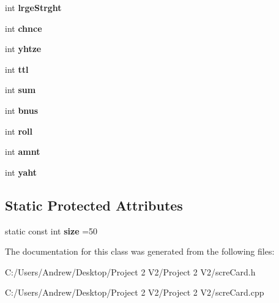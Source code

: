 \begin{DoxyCompactItemize}
int {\bfseries lrge\+Strght}
\item 
\mbox{\label{classscre_card_a51c57ac55b54259138ee5050737870f3}} 
int {\bfseries chnce}
\item 
\mbox{\label{classscre_card_a8e09c3ec5e587e509d328af285e028b8}} 
int {\bfseries yhtze}
\item 
\mbox{\label{classscre_card_abbef5f6461fd43f42b5cbc3d80201965}} 
int {\bfseries ttl}
\item 
\mbox{\label{classscre_card_a3d1894a3cb33c1dddca4488f5b24d3aa}} 
int {\bfseries sum}
\item 
\mbox{\label{classscre_card_a236a10cc04262b34ec7f451ce48d6601}} 
int {\bfseries bnus}
\item 
\mbox{\label{classscre_card_a8a26609e3af7188b3de9aafdfbfe7322}} 
int {\bfseries roll}
\item 
\mbox{\label{classscre_card_a110c480d7941945972c62ec1858b3ce8}} 
int {\bfseries amnt}
\item 
\mbox{\label{classscre_card_acad4ba6ad4d766bbdb27529f24bfcf76}} 
int {\bfseries yaht}
\end{DoxyCompactItemize}
\subsection*{Static Protected Attributes}
\begin{DoxyCompactItemize}
\item 
\mbox{\label{classscre_card_a485879ffa922530b13036a5078913e4a}} 
static const int {\bfseries size} =50
\end{DoxyCompactItemize}


The documentation for this class was generated from the following files\+:\begin{DoxyCompactItemize}
\item 
C\+:/\+Users/\+Andrew/\+Desktop/\+Project 2 V2/\+Project 2 V2/scre\+Card.\+h\item 
C\+:/\+Users/\+Andrew/\+Desktop/\+Project 2 V2/\+Project 2 V2/scre\+Card.\+cpp\end{DoxyCompactItemize}
